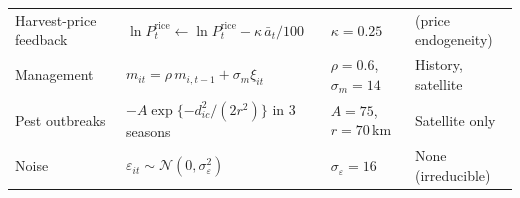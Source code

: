 \begin{table}[t]
\begin{tabularx}{\textwidth}{@{}p{2.3cm}Xp{3.9cm}p{2.3cm}@{}}
Harvest-price feedback & $\ln P^{\mathrm{rice}}_t \leftarrow \ln P^{\mathrm{rice}}_t-\kappa\,\bar a_t/100$ & $\kappa=0.25$ & (price endogeneity) \\
Management & $m_{it}=\rho\,m_{i,t-1}+\sigma_m\xi_{it}$ & $\rho=0.6$, $\sigma_m=14$ & History, satellite \\
Pest outbreaks & $-A\exp\{-d_{ic}^2/(2r^2)\}$ in 3 seasons & $A=75$, $r=70$\,km & Satellite only \\
Noise & $\varepsilon_{it}\sim\mathcal N(0,\sigma_\varepsilon^2)$ & $\sigma_\varepsilon=16$ & None (irreducible) \\
\bottomrule
\end{tabularx}
\end{table}